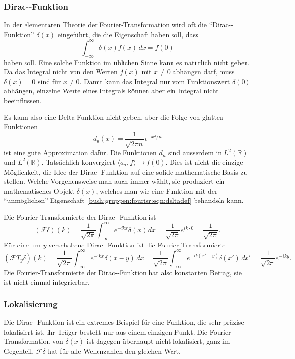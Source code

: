 \subsubsection{Dirac-\textdelta-Funktion}
In der elementaren Theorie der Fourier-Transformation wird oft 
die ``Dirac-\textdelta-Funktion'' $\delta(x)$ eingeführt, die die
%
Eigenschaft haben soll, dass
\begin{equation}
\int_{-\infty}^\infty \delta(x) f(x)\,dx = f(0)
\label{buch:gruppen:fourier:eqn:deltadef}
\end{equation}
haben soll.
Eine solche Funktion im üblichen Sinne kann es natürlich nicht geben.
Da das Integral nicht von den Werten $f(x)$ mit $x\ne 0$ abhängen darf,
muss $\delta(x)=0$ sind für $x\ne 0$.
Damit kann das Integral nur vom Funktionswert $\delta(0)$ abhängen,
einzelne Werte eines Integrals können aber ein Integral nicht beeinflussen.

Es kann also eine Delta-Funktion nicht geben, aber die Folge von
glatten Funktionen
\[
d_n(x) = \frac{1}{\!\sqrt{2\pi n}} e^{-x^2/n}
\]
ist eine gute Approximation dafür.
Die Funktionen $d_n$ sind ausserdem in $L^2(\mathbb{R})$ und
$L^2(\mathbb{R})$.
Tatsächlich konvergiert $\langle d_n,f\rangle \to f(0)$.
Dies ist nicht die einzige Möglichkeit, die Idee der 
Dirac-\textdelta-Funktion auf eine solide mathematische Basis zu
stellen.
Welche Vorgehensweise man auch immer wählt, sie produziert ein
mathematisches Objekt $\delta(x)$, welches man wie eine Funktion
mit der ``unmöglichen'' Eigenschaft
\eqref{buch:gruppen:fourier:eqn:deltadef}
behandeln kann.

Die Fourier-Transformierte der Dirac-\textdelta-Funktion ist
\[
(\mathscr{F}\delta)(k)
=
\frac{1}{\!\sqrt{2\pi}}
\int_{-\infty}^\infty e^{-ikx}\delta(x)\,dx
=
\frac{1}{\!\sqrt{2\pi}}
e^{ik\cdot 0}
=
\frac{1}{\!\sqrt{2\pi}}.
\]
Für eine um $y$ verschobene Dirac-\textdelta-Funktion ist die
Fourier-Transformierte
\[
(\mathscr{F}T_y\delta)(k)
=
\frac{1}{\!\sqrt{2\pi}}
\int_{-\infty}^\infty e^{-ikx}\delta(x-y)\,dx
=
\frac{1}{\!\sqrt{2\pi}}
\int_{-\infty}^\infty e^{-ik(x'+y)}\delta(x')\,dx'
=
\frac{1}{\!\sqrt{2\pi}}
e^{-iky}.
\]
Die Fourier-Transformierte der Dirac-\textdelta-Funktion hat also 
konstanten Betrag, sie ist nicht einmal integrierbar.

%
%
\subsubsection{Lokalisierung}
Die Dirac-\textdelta-Funktion ist ein extremes Beispiel für eine
Funktion, die sehr präzise lokalisiert ist, ihr Träger besteht nur
aus einem einzigen Punkt.
Die Fourier-Transformation von $\delta(x)$ ist dagegen überhaupt
nicht lokalisiert, ganz im Gegenteil, $\mathscr{F}\delta$ hat für alle
Wellenzahlen den gleichen Wert.

